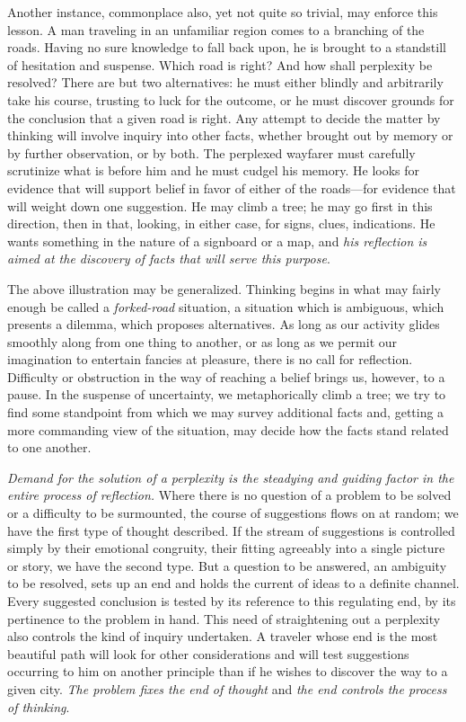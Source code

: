 \documentclass[showtrims,ustradepaper]{memoir}
\begin{document}
Another instance, commonplace also, yet not quite so trivial, may
enforce this lesson. A man traveling in an unfamiliar region comes to a
branching of the roads. Having no sure knowledge to fall back upon, he
is brought to a standstill of hesitation and suspense. Which road is
right? And how shall perplexity be resolved? There are but two
alternatives: he must either blindly and arbitrarily take his course,
trusting to luck for the outcome, or he must discover grounds for the
conclusion that a given road is right. Any attempt to decide the matter
by thinking will involve inquiry into other facts, whether brought out
by memory or by further observation, or by both. The perplexed wayfarer
must carefully scrutinize what is before him and he must cudgel his
memory. He looks for evidence that will support belief in favor of
either of the roads---for evidence that will weight down one suggestion.
He may climb a tree; he may go first in this direction, then in that,
looking, in either case, for signs,
clues,
indications. He wants something in the nature of a signboard or a map,
and \emph{his reflection is aimed at the discovery of facts that will
serve this purpose}.


The above illustration may be generalized. Thinking begins in what may
fairly enough be called a \emph{forked-road} situation, a situation
which is ambiguous, which presents a dilemma, which proposes
alternatives. As long as our activity glides smoothly along from one
thing to another, or as long as we permit our imagination to entertain
fancies at pleasure, there is no call for reflection. Difficulty or
obstruction in the way of reaching a belief brings us, however, to a
pause. In the suspense of uncertainty, we metaphorically climb a tree;
we try to find some standpoint from which we may survey additional facts
and, getting a more commanding view of the situation, may decide how the
facts stand related to one another.


\emph{Demand for the solution of a perplexity is the steadying and
guiding factor in the entire process of reflection.} Where there is no
question of a problem to be solved or a difficulty to be surmounted, the
course of suggestions flows on at random; we have the first type of
thought described. If the stream of suggestions is controlled simply by
their emotional congruity, their fitting agreeably into a single picture
or story, we have the second type. But a question to be answered, an
ambiguity to be resolved, sets up an end and holds the current of ideas
to a definite channel. Every suggested conclusion is tested by its
reference to this regulating end, by its pertinence to the problem in
hand. This need of straightening out a perplexity also controls the kind
of inquiry undertaken. A traveler whose end is the most beautiful path
will look for other considerations
and
will test suggestions occurring to him on another principle than if he
wishes to discover the way to a given city. \emph{The problem fixes the
end of thought} and \emph{the end controls the process of thinking}.
\end{document}

